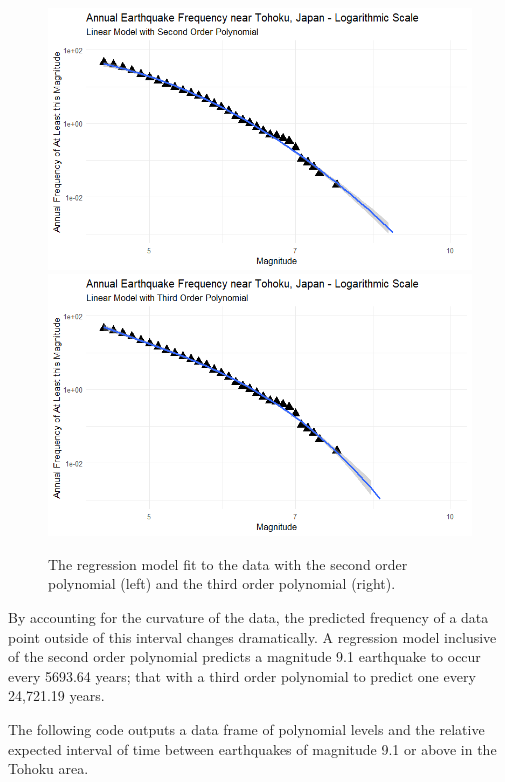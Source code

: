 \begin{figure}[H]
    \includegraphics[width=0.5\linewidth]{Figures/tohoku_logscale_fit2.png}
    \includegraphics[width=0.5\linewidth]{Figures/tohoku_logscale_fit3.png}
    \caption{\footnotesize{The regression model fit to the data with the second order polynomial (left) and the third order polynomial (right).}}
    \label{tohoku_lm23}
\end{figure}

By accounting for the curvature of the data, the predicted frequency of a data point outside of this interval changes dramatically.  A regression model inclusive of the second order polynomial predicts a magnitude 9.1 earthquake to occur every 5693.64 years; that with a third order polynomial to predict one every 24,721.19 years.

The following code outputs a data frame of polynomial levels and the relative expected interval of time between earthquakes of magnitude 9.1 or above in the Tohoku area.

\begin{Shaded}
\begin{Highlighting}[]
\OtherTok{\textless{}{-}} \SpecialCharTok{:}
\OtherTok{\textless{}{-}} 

\OtherTok{\textless{}{-}} \NormalTok{(}\SpecialCharTok{\textasciitilde{}} 
\OtherTok{\textless{}{-}}  \NormalTok{(} \NormalTok{))}
\OtherTok{\textless{}{-}} \SpecialCharTok{/}\SpecialCharTok{\^{}}
\NormalTok{\}}
\end{Highlighting}
\end{Shaded}

